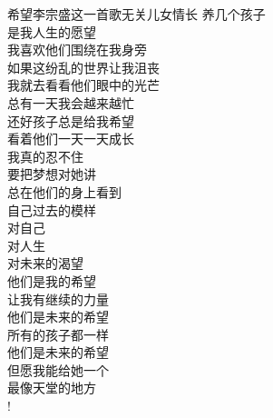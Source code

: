 \begin{poem}{希望}{李宗盛}{这一首歌无关儿女情长}
养几个孩子\\
是我人生的愿望\\
我喜欢他们围绕在我身旁\\
如果这纷乱的世界让我沮丧\\
我就去看看他们眼中的光芒\\
总有一天我会越来越忙\\
还好孩子总是给我希望\\
看着他们一天一天成长\\
我真的忍不住\\
要把梦想对她讲\\
总在他们的身上看到\\
自己过去的模样\\
对自己\\
对人生\\
对未来的渴望\\
他们是我的希望\\
让我有继续的力量\\
他们是未来的希望\\
所有的孩子都一样\\
他们是未来的希望\\
但愿我能给她一个\\
最像天堂的地方\\!


\end{poem}

